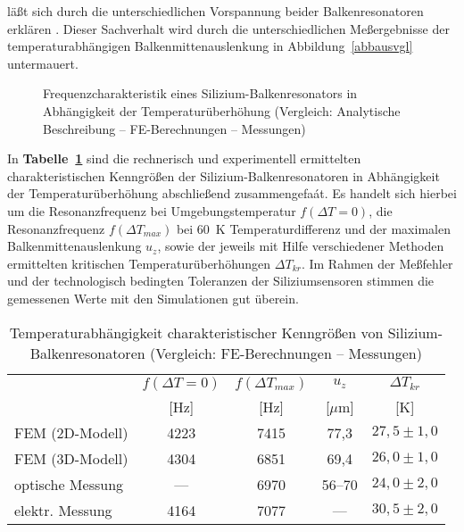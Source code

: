 läßt sich durch die unterschiedlichen Vorspannung beider Balkenresonatoren
erklären \cite{Lin93}. Dieser Sachverhalt wird durch die unterschiedlichen
Meßergebnisse der temperaturabhängigen Balkenmittenauslenkung in
Abbildung~\ref{abbausvgl} untermauert.\\
\begin{figure}[htb]
\begin{center}

\setabbvee
\end{center}
\caption{\label{abbfreqvgl}
 Frequenzcharakteristik eines Silizium-Balkenresonators in Abhängigkeit
 der Temperaturüberhöhung
 (Vergleich: Analytische Beschreibung -- FE-Berechnungen -- Messungen)}
\end{figure}
In {\bf Tabelle~\ref{tabdeltatkr}} sind die rechnerisch und experimentell
ermittelten charakteristischen Kenngrößen der Silizium-Balkenresonatoren
in Abhängigkeit der Temperaturüberhöhung abschließend zusammengefaát.
Es handelt sich hierbei um die Resonanzfrequenz bei Umgebungstemperatur
$f(\Delta T=0)$, die Resonanzfrequenz $f(\Delta T_{max})$ bei 60~K
Temperaturdifferenz und der maximalen Balkenmittenauslenkung
$u_{z}$, sowie der jeweils mit Hilfe verschiedener Methoden ermittelten
kritischen Temperaturüberhöhungen $\Delta T_{kr}$. Im Rahmen der
Meßfehler und der technologisch bedingten Toleranzen der Siliziumsensoren
stimmen die gemessenen Werte mit den Simulationen gut überein.\\
\begin{table}[htb]
\begin{center}
\begin{tabular}{|l||c|c|c|c|}
\hline
  & $f(\Delta T=0)$ & $f(\Delta T_{max})$ & $u_{z}$  & $\Delta T_{kr}$ \\
  &      [Hz]       &     [Hz]            & [$\mu$m] &  [K]  \\
\hline \hline
  FEM (2D-Modell)          &  4223  &  7415  & 77,3    &  $27,5\pm1,0$  \\
  FEM (3D-Modell)          &  4304  &  6851  & 69,4    &  $26,0\pm1,0$  \\
\hline
  optische Messung  &  ---   &  6970  & 56--70  &  $24,0\pm2,0$  \\
  elektr. Messung   &  4164  &  7077  & ---     &  $30,5\pm2,0$  \\
\hline
\end{tabular}
\end{center}
\caption{\label{tabdeltatkr}
 Temperaturabhängigkeit charakteristischer Kenngrößen von
 Silizium-Balkenresonatoren (Vergleich: FE-Berechnungen -- Messungen)}
\end{table}
